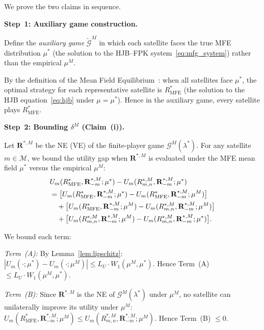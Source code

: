 \documentclass[journal]{IEEEtran}
\newcommand{\calM}{\mathcal{M}}
\newcommand{\calG}{\mathcal{G}}
\newcommand{\bfR}{\mathbf{R}}
\begin{document}
\begin{IEEEproof}
We prove the two claims in sequence.

\smallskip
\noindent\textbf{Step~1: Auxiliary game construction.}

Define the \emph{auxiliary game} $\widetilde{\calG}^M$ in which each satellite faces the true MFE distribution $\mu^*$ (the solution to the HJB--FPK system~\eqref{eq:mfg_system}) rather than the empirical $\mu^M$.

By the definition of the Mean Field Equilibrium~\cite{lasry2007mfg}: when all satellites face $\mu^*$, the optimal strategy for each representative satellite is $R_{\mathrm{MFE}}^*$ (the solution to the HJB equation~\eqref{eq:hjb} under $\mu = \mu^*$). Hence in the auxiliary game, every satellite plays $R_{\mathrm{MFE}}^*$.

\smallskip
\noindent\textbf{Step~2: Bounding $\delta^M$
(Claim~(i)).}

Let $\bfR^{*,M}$ be the NE (VE) of the finite-player game $\calG^M(\lambda^*)$. For any satellite $m \in \calM$, we bound the utility gap when $\bfR^{*,M}$ is evaluated under the MFE mean field $\mu^*$ versus the empirical $\mu^M$:
\begin{align}
    &U_m(R_{\mathrm{MFE}}^*,
    \bfR_{-m}^{*,M}; \mu^*)
    - U_m(R_{m,n}^{*,M},
    \bfR_{-m}^{*,M}; \mu^*)
    \notag\\
    &=\bigl[U_m(R_{\mathrm{MFE}}^*,
    \bfR_{-m}^{*,M}; \mu^*)
    - U_m(R_{\mathrm{MFE}}^*,
    \bfR_{-m}^{*,M}; \mu^M)\bigr]
    \notag\\
    &\quad +\bigl[U_m(R_{\mathrm{MFE}}^*,
    \bfR_{-m}^{*,M}; \mu^M)
    - U_m(R_{m,n}^{*,M},
    \bfR_{-m}^{*,M}; \mu^M)\bigr]
    \notag\\
    &\quad +\bigl[U_m(R_{m,n}^{*,M},
    \bfR_{-m}^{*,M}; \mu^M)
    - U_m(R_{m,n}^{*,M},
    \bfR_{-m}^{*,M}; \mu^*)\bigr].
    \label{eq:three_terms}
\end{align}

We bound each term:

\emph{Term~(A):}
By Lemma~\ref{lem:lipschitz}: $|U_m(\cdot;\mu^*) - U_m(\cdot;\mu^M)|
\leq L_U \cdot W_1(\mu^M, \mu^*)$.
Hence Term~(A) $\leq L_U \cdot W_1(\mu^M, \mu^*)$.

\emph{Term~(B):}
Since $\bfR^{*,M}$ is the NE of $\calG^M(\lambda^*)$ under $\mu^M$, no satellite can unilaterally improve its utility under $\mu^M$: $U_m(R_{\mathrm{MFE}}^*, \bfR_{-m}^{*,M}; \mu^M)
\leq U_m(R_{m,n}^{*,M}, \bfR_{-m}^{*,M}; \mu^M)$.
Hence Term~(B) $\leq 0$.


\end{IEEEproof}
\end{document}
